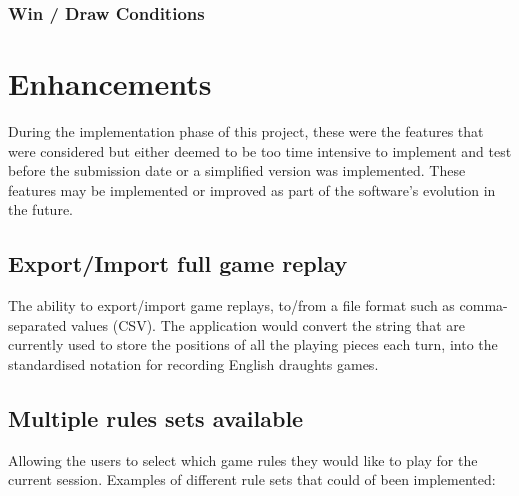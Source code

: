 \documentclass[10pt, a4paper]{article}
\begin{document}
    \subsubsection{Win / Draw Conditions}
    
    
    
    
    
    

    
    
    
    \section{Enhancements}
    During the implementation phase of this project, these were the features that were considered but either deemed to be too time intensive to implement and test before the submission date or a simplified version was implemented. These features may be implemented or improved as part of the software's evolution in the future. 
    
    \subsection{Export/Import full game replay}
    The ability to export/import game replays, to/from a file format such as comma-separated values (CSV).
    \newline   
    The application would convert the string that are currently used to store the positions of all the playing pieces each turn, into the standardised notation for recording English draughts games.
    
    \subsection{Multiple rules sets available}
    Allowing the users to select which game rules they would like to play for the current session. Examples of different rule sets that could of been implemented: 
    
\end{document}
